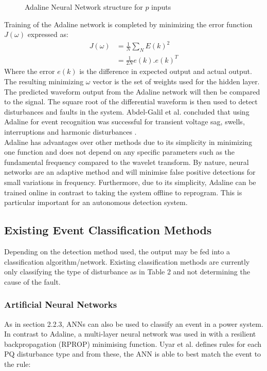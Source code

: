 \documentclass[12pt]{article}
\begin{document}
{\begin{figure}[H]
\caption{Adaline Neural Network structure for $p$ inputs}
\end{figure}
\newpage
Training of the Adaline network is completed by minimizing the error function $J(\omega)$ expressed as:
\begin{align*}
J(\omega) &= \frac{1}{N} \sum_N E(k)^2 \\
&= \frac{1}{2N} e(k).e(k)^T
\end{align*}
Where the error $e(k)$ is the difference in expected output and actual output. The resulting minimizing $\omega$ vector is the set of weights used for the hidden layer.\newline
\\
The predicted waveform output from the Adaline network will then be compared to the signal. The square root of the differential waveform is then used to detect disturbances and faults in the system. Abdel-Galil et al. concluded that using Adaline for event recognition was successful for transient voltage sag, swells, interruptions and harmonic disturbances \cite{AD}. \newline
\\
Adaline has advantages over other methods due to its simplicity in minimizing one function and does not depend on any specific parameters such as the fundamental frequency compared to the wavelet transform. By nature, neural networks are an adaptive method and will minimise false positive detections for small variations in frequency. Furthermore, due to its simplicity, Adaline can be trained online in contrast to taking the system offline to reprogram. This is particular important for an autonomous detection system.


\newpage
\subsection{Existing Event Classification Methods}
Depending on the detection method used, the output may be fed into a classification algorithm/network. Existing classification methods are currently only classifying the type of disturbance as in Table 2 and not determining the cause of the fault. 
\subsubsection{Artificial Neural Networks}
As in section 2.2.3, ANNs can also be used to classify an event in a power system. In contrast to Adaline, a multi-layer neural network was used in \cite{ANNClass} with a resilient backpropagation (RPROP) minimising function. Uyar et al. defines rules for each PQ disturbance type and from these, the ANN is able to best match the event to the rule:

}
\end{document}
